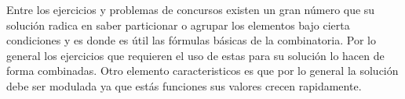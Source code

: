 Entre los ejercicios y problemas de concursos existen un gran número que su solución radica en saber particionar o agrupar los elementos bajo cierta condiciones y es donde es útil las fórmulas básicas de la combinatoria. Por lo general los ejercicios que requieren el uso de estas para su solución lo hacen de forma combinadas. Otro elemento caracteristicos es que por lo general la solución debe ser modulada ya que estás funciones sus valores crecen rapidamente. 